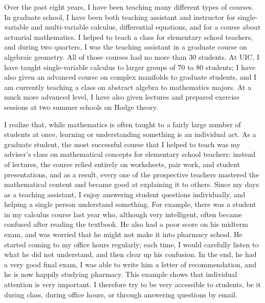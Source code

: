 \documentclass[11pt]{amsart}
\begin{document}
Over the past eight years, I have been teaching many different types of courses.  In
graduate school, I have been both teaching assistant and instructor for
single-variable and multi-variable calculus, differential equations, and for a course
about actuarial mathematics. I helped to teach a class for elementary school
teachers, and during two quarters, I was the teaching assistant in a graduate course
on algebraic geometry. All of those courses had no more than 30 students. At UIC, I
have taught single-variable calculus to larger groups of 70 to 80 students; I have
also given an advanced course on complex manifolds to graduate students, and I am
currently teaching a class on abstract algebra to mathematics majors. At a much more
advanced level, I have also given lectures and prepared exercise sessions at two
summer schools on Hodge theory.

I realize that, while mathematics is often taught to a fairly large number of
students at once, learning or understanding something is an individual act. As a
graduate student, the most successful course that I helped to teach was my adviser's
class on mathematical concepts for elementary school teachers: instead of lectures,
the course relied entirely on worksheets, pair work, and student presentations, and
as a result, every one of the prospective teachers mastered the mathematical content
and became good at explaining it to others. Since my days as a teaching assistant, I
enjoy answering student questions individually, and helping a single person
understand something. For example, there was a student in my calculus course last
year who, although very intelligent, often became confused after reading the
textbook. He also had a poor score on his midterm exam, and was worried that he
might not make it into pharmacy school. He started coming to my office hours
regularly; each time, I would carefully listen to what he did not understand, and
then clear up his confusion.  In the end, he had a very good final exam, I was able
to write him a letter of recommendation, and he is now happily studying pharmacy.
This example shows that individual attention is very important. I therefore try to be
very accessible to students, be it during class, during office hours, or through
answering questions by email. 
\end{document}
